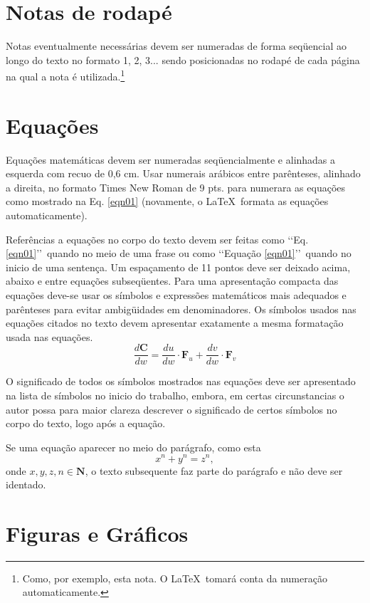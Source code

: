 \section{Notas de rodapé}

Notas eventualmente necessárias devem ser numeradas de forma seqüencial ao
longo do texto no formato 1, 2, 3... sendo posicionadas no rodapé de cada
página na qual a nota é utilizada.\footnote{Como, por exemplo, esta nota. O \LaTeX\ tomará conta da numeração automaticamente.}

\section{Equações}

Equações matemáticas devem ser numeradas seqüencialmente e alinhadas a
esquerda com recuo de 0,6 cm. Usar numerais arábicos entre parênteses,
alinhado a direita, no formato Times New Roman de 9 pts. para numerara as
equações como mostrado na Eq. \ref{eqn01} (novamente, o \LaTeX\ formata as
equações automaticamente).

Referências a equações no corpo do texto devem ser feitas como \lq\lq Eq.
\ref{eqn01}\rq\rq\ quando no meio de uma frase ou como \lq\lq Equação
\ref{eqn01}\rq\rq\ quando no inicio de uma sentença. Um espaçamento de 11
pontos deve ser deixado acima, abaixo e entre equações subseqüentes. Para uma
apresentação compacta das equações deve-se usar os símbolos e expressões
matemáticos mais adequados e parênteses para evitar ambigüidades em
denominadores. Os símbolos usados nas equações citados no texto devem
apresentar exatamente a mesma formatação usada nas equações.
\begin{equation}
\label{eqn01}
	\frac{d\mathbf{C}}{dw} = \frac{du}{dw}\cdot \mathbf{F}_u +
		\frac{dv}{dw}\cdot \mathbf{F}_v
\end{equation}

O significado de todos os símbolos mostrados nas equações deve ser apresentado
na lista de símbolos no inicio do trabalho, embora, em certas circunstancias o
autor possa para maior clareza descrever o significado de certos símbolos no
corpo do texto, logo após a equação.

Se uma equação aparecer no meio do parágrafo, como esta
\begin{equation}
x^n + y^n = z^n,
\end{equation}
onde $x, y, z, n \in \mathbf{N}$, o texto subsequente faz parte do parágrafo e
não deve ser identado.

\section{Figuras e Gráficos}

